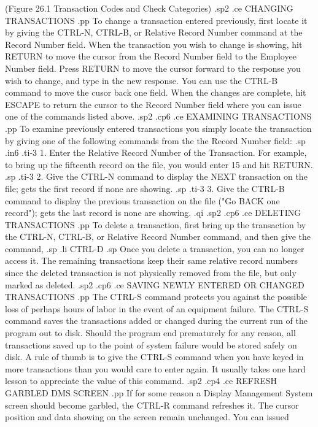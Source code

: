   (Figure 26.1 Transaction Codes and Check Categories)
.sp2
.ce
CHANGING TRANSACTIONS
.pp
To change a transaction entered previously, first locate it by giving
the CTRL-N,
CTRL-B, or Relative Record Number command at the Record Number field.
When the transaction you wish to change is showing, hit RETURN to move
the cursor from the Record Number field to the Employee Number field.
Press RETURN to move the cursor forward to the response you wish to change,
and type in the new response.  You can use the CTRL-B command to move
the cusor back one field.  When the changes are complete, hit ESCAPE
to return the cursor to the Record Number field where you can issue one
of the commands listed above.
.sp2
.cp6
.ce
EXAMINING TRANSACTIONS
.pp
To examine previously entered transactions you simply locate the
transaction by giving one of the following commands from the the
Record Number field:
.sp
.in6
.ti-3
1. Enter the Relative Record Number of the Transaction. For example,
to bring up the fifteenth record on the file, you would enter 15
and hit RETURN.
.sp
.ti-3
2. Give the CTRL-N command to display the NEXT transaction on the
file; gets the first record if none are showing.
.sp
.ti-3
3. Give the CTRL-B command to display the previous transaction on
the file ("Go BACK one record"); gets the last record is none are
showing.
.qi
.sp2
.cp6
.ce
DELETING TRANSACTIONS
.pp
To delete a transaction, first bring up the transaction by the
CTRL-N, CTRL-B, or Relative Record Number command, and then
give the command,
.sp
.li
		CTRL-D
.sp
Once you delete a transaction, you can no longer access it.
The remaining transactions keep their same relative record numbers
since the deleted transaction is not physically removed from the file,
but only marked as deleted.
.sp2
.cp6
.ce
SAVING NEWLY ENTERED OR CHANGED TRANSACTIONS
.pp
The CTRL-S command protects you against the possible loss of perhaps hours
of labor in the event of an equipment failure.	The CTRL-S command
saves the transactions added or changed during the current
run of the program out to disk.  Should the program end prematurely
for any reason, all transactions saved up to the point of system
failure would be stored safely on disk.  A rule of thumb is to give
the CTRL-S command when you have keyed in more transactions
than you would care to enter again.  It usually takes one hard lesson
to appreciate the value of this command.
.sp2
.cp4
.ce
REFRESH GARBLED DMS SCREEN
.pp
If for some reason a Display Management System screen should become
garbled, the CTRL-R command refreshes it.  The cursor position
and data showing on the screen remain unchanged.  You can issued

